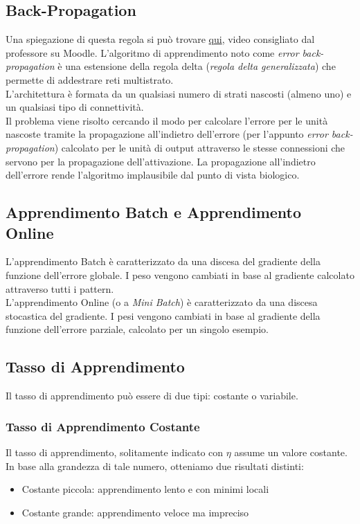 \subsection{Back-Propagation}
Una spiegazione di questa regola si può trovare \href{https://www.youtube.com/watch?v=Ilg3gGewQ5U}{qui}, video consigliato dal professore su Moodle.
L'algoritmo di apprendimento noto come \textit{error back-propagation} è una estensione della regola delta (\textit{regola delta generalizzata}) che permette di addestrare reti multistrato.\\
L'architettura è formata da un qualsiasi numero di strati nascosti (almeno uno) e un qualsiasi tipo di connettività.\\
Il problema viene risolto cercando il modo per calcolare l'errore per le unità nascoste tramite la propagazione all'indietro dell'errore (per l'appunto \textit{error back-propagation}) calcolato per le unità di output attraverso le stesse connessioni che servono per la propagazione dell'attivazione. La propagazione all'indietro dell'errore rende l'algoritmo implausibile dal punto di vista biologico.

\subsection{Apprendimento Batch e Apprendimento Online}
L'apprendimento Batch è caratterizzato da una discesa del gradiente della funzione dell'errore globale. I peso vengono cambiati in base al gradiente calcolato attraverso tutti i pattern.\\
L'apprendimento Online (o a \textit{Mini Batch}) è caratterizzato da una discesa stocastica del gradiente. I pesi vengono cambiati in base al gradiente della funzione dell'errore parziale, calcolato per un singolo esempio.

\subsection{Tasso di Apprendimento}
Il tasso di apprendimento può essere di due tipi: costante o variabile.

\subsubsection{Tasso di Apprendimento Costante}
Il tasso di apprendimento, solitamente indicato con \(\eta\) assume un valore costante. In base alla grandezza di tale numero, otteniamo due risultati distinti:
\begin{itemize}
    \item Costante piccola: apprendimento lento e con minimi locali
    \item Costante grande: apprendimento veloce ma impreciso
\end{itemize}

